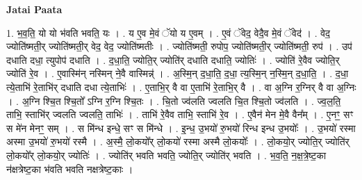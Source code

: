\documentclass[17pt]{extarticle}
\begin{document}
\textbf{Jatai Paata} \newline

1. भ॒व॒ति॒ यो यो भ॑वति भवति॒ यः । . य ए॒व मे॒वं ॅयो य ए॒वम् । . ए॒वं ॅवेद॒ वेदै॒व मे॒वं ॅवेद॑ । . वेद॒ ज्योति॑ष्मती॒र् ज्योति॑ष्मती॒र् वेद॒ वेद॒ ज्योति॑ष्मतीः । . ज्योति॑ष्मती॒ रुपोप॒ ज्योति॑ष्मती॒र् ज्योति॑ष्मती॒ रुप॑ । . उप॑ दधाति दधा॒ त्युपोप॑ दधाति । . द॒धा॒ति॒ ज्योति॒र् ज्योति॑र् दधाति दधाति॒ ज्योतिः॑ । . ज्योति॑ रे॒वैव ज्योति॒र् ज्योति॑ रे॒व । . ए॒वास्मि॑न् नस्मिन् ने॒वै वास्मिन्न्॑ । . अ॒स्मि॒न् द॒धा॒ति॒ द॒धा॒ त्य॒स्मि॒न् न॒स्मि॒न् द॒धा॒ति॒ । . द॒धा॒ त्ये॒ताभि॑ रे॒ताभि॑र् दधाति दधा त्ये॒ताभिः॑ । . ए॒ताभि॒र् वै वा ए॒ताभि॑ रे॒ताभि॒र् वै । . वा अ॒ग्नि र॒ग्निर् वै वा अ॒ग्निः । . अ॒ग्नि श्चि॒त श्चि॒तो᳚ ऽग्नि र॒ग्नि श्चि॒तः । . चि॒तो ज्व॑लति ज्वलति चि॒त श्चि॒तो ज्व॑लति । . ज्व॒ल॒ति॒ ताभि॒ स्ताभि॑र् ज्वलति ज्वलति॒ ताभिः॑ । . ताभि॑ रे॒वैव ताभि॒ स्ताभि॑ रे॒व । . ए॒वैन॑ मेन मे॒वै वैन᳚म् । . ए॒नꣳ॒॒ सꣳ स मे॑न मेनꣳ॒॒ सम् । . स मि॑न्ध इन्धे॒ सꣳ स मि॑न्धे । . इ॒न्ध॒ उ॒भयो॑ रु॒भयो॑ रिन्ध इन्ध उ॒भयोः᳚ । . उ॒भयो॑ रस्मा अस्मा उ॒भयो॑ रु॒भयो॑ रस्मै । . अ॒स्मै॒ लो॒कयो᳚र् लो॒कयो॑ रस्मा अस्मै लो॒कयोः᳚ । . लो॒कयो॒र् ज्योति॒र् ज्योति॑र् लो॒कयो᳚र् लो॒कयो॒र् ज्योतिः॑ । . ज्योति॑र् भवति भवति॒ ज्योति॒र् ज्योति॑र् भवति । . भ॒व॒ति॒ न॒क्ष॒त्रे॒ष्ट॒का न॑क्षत्रेष्ट॒का भ॑वति भवति नक्षत्रेष्ट॒काः । \newline
\end{document}
